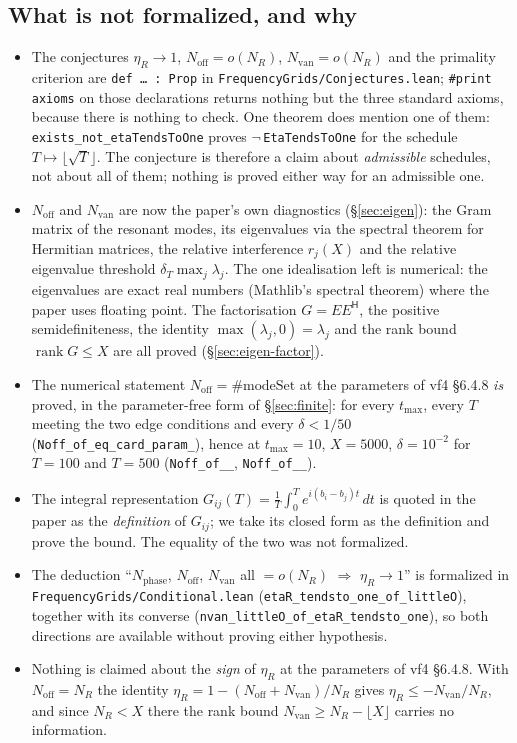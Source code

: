 \documentclass[11pt,a4paper]{article}
\newcommand{\lb}{\_\allowbreak}
\newcommand{\code}[1]{\texttt{#1}}
\newcommand{\itemization}[1]{\begin{itemize}[leftmargin=1.4em,itemsep=1pt,topsep=2pt]#1\end{itemize}}
\theoremstyle{definition}
\theoremstyle{remark}
\begin{document}
\subsection*{What is not formalized, and why}

\itemization{
\item The conjectures $\eta_R\to1$, $N_{\mathrm{off}}=o(N_R)$,
  $N_{\mathrm{van}}=o(N_R)$ and the primality criterion are \code{def \dots{} : Prop} in
  \code{FrequencyGrids/Conjectures.lean}; \code{\#print axioms} on those declarations
  returns nothing but the three standard axioms, because there is nothing to check.  One
  theorem does mention one of them: \code{exists\lb not\lb etaTendsToOne} proves
  $\neg\,$\code{EtaTendsToOne} for the schedule $T\mapsto\lfloor\sqrt T\rfloor$.  The
  conjecture is therefore a claim about \emph{admissible} schedules, not about all of them;
  nothing is proved either way for an admissible one.
\item $N_{\mathrm{off}}$ and $N_{\mathrm{van}}$ are now the paper's own diagnostics
  (\S\ref{sec:eigen}): the Gram matrix of the resonant modes, its eigenvalues via the
  spectral theorem for Hermitian matrices, the relative interference $r_j(X)$ and the
  relative eigenvalue threshold $\delta_T\max_j\lambda_j$.  The one idealisation left is
  numerical: the eigenvalues are exact real numbers (Mathlib's spectral theorem) where the
  paper uses floating point.  The factorisation $G=EE^{\mathsf H}$, the positive
  semidefiniteness, the identity $\max(\lambda_j,0)=\lambda_j$ and the rank bound
  $\operatorname{rank}G\le X$ are all proved (\S\ref{sec:eigen-factor}).
\item The numerical statement $N_{\mathrm{off}}=\#\mathrm{modeSet}$ at the parameters of
  vf4 \S6.4.8 \emph{is} proved, in the parameter-free form of \S\ref{sec:finite}: for every
  $t_{\max}$, every $T$ meeting the two edge conditions and every $\delta<1/50$
  (\code{Noff\lb of\lb eq\lb card\lb param\lb 5000}), hence at $t_{\max}=10$, $X=5000$,
  $\delta=10^{-2}$ for $T=100$ and $T=500$ (\code{Noff\lb of\lb 10\lb 100},
  \code{Noff\lb of\lb 10\lb 500}).
\item The integral representation $G_{ij}(T)=\frac1T\int_0^Te^{i(b_i-b_j)t}\,dt$ is quoted in
  the paper as the \emph{definition} of $G_{ij}$; we take its closed form as the definition
  and prove the bound.  The equality of the two was not formalized.
\item The deduction ``$N_{\mathrm{phase}}$, $N_{\mathrm{off}}$, $N_{\mathrm{van}}$ all
  $=o(N_R)$ $\Rightarrow$ $\eta_R\to1$'' is formalized in
  \code{FrequencyGrids/\allowbreak Conditional.lean}
  (\code{etaR\lb tendsto\lb one\lb of\lb littleO}), together with its converse
  (\code{nvan\lb littleO\lb of\lb etaR\lb tendsto\lb one}), so both directions are
  available without proving either hypothesis.
\item Nothing is claimed about the \emph{sign} of $\eta_R$ at the parameters of vf4
  \S6.4.8.  With $N_{\mathrm{off}}=N_R$ the identity $\eta_R=1-(N_{\mathrm{off}}+
  N_{\mathrm{van}})/N_R$ gives $\eta_R\le-N_{\mathrm{van}}/N_R$, and since $N_R<X$ there the
  rank bound $N_{\mathrm{van}}\ge N_R-\lfloor X\rfloor$ carries no information.
}
\end{document}
